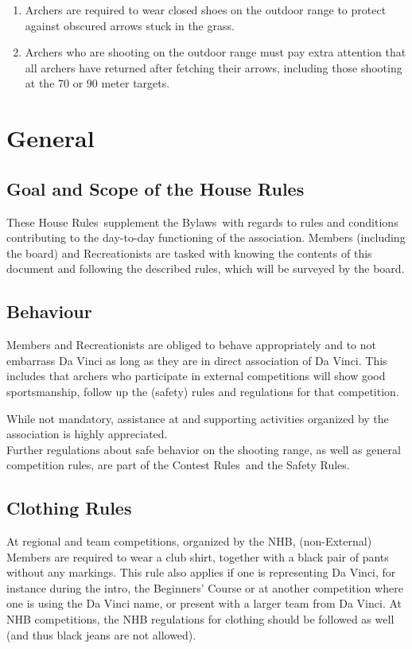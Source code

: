 \documentclass[a4paper]{article}
\newcommand{\Asta}{Bylaws} %
\newcommand{\Ahr}{House Rules} %
\newcommand{\Asr}{Safety Rules} %
\newcommand{\Awr}{Contest Rules} %
\begin{document}
\begin{enumerate}
  \item Archers are required to wear closed shoes on the outdoor range to protect against obscured arrows stuck in the grass.
  \item Archers who are shooting on the outdoor range must pay extra attention that all archers have returned after fetching their arrows, including those shooting at the 70 or 90 meter targets.
\end{enumerate}

\section{General}
\subsection{Goal and Scope of the \Ahr}
These \Ahr\ supplement the \Asta\ with regards to rules and conditions contributing to the day-to-day functioning of the association. Members (including the board) and Recreationists are tasked with knowing the contents of this document and following the described rules, which will be surveyed by the board. \\

\subsection{Behaviour}
Members and Recreationists are obliged to behave appropriately and to not embarrass Da Vinci as long as they are in direct association of Da Vinci. This includes that archers who participate in external competitions will show good sportsmanship, follow up the (safety) rules and regulations for that competition. 

While not mandatory, assistance at and supporting activities organized by the association is highly appreciated. \\

Further regulations about safe behavior on the shooting range, as well as general competition rules, are part of the \Awr\ and the \Asr .

\subsection{Clothing Rules}
\label{section:clubclothing}
At regional and team competitions, organized by the NHB, (non-External) Members are required to wear a club shirt, together with a black pair of pants without any markings. This rule also applies if one is representing Da Vinci, for instance during the intro, the Beginners' Course or at another competition where one is using the Da Vinci name, or present with a larger team from Da Vinci. At NHB competitions, the NHB regulations for clothing should be followed as well (and thus black jeans are not allowed).
\end{document}
